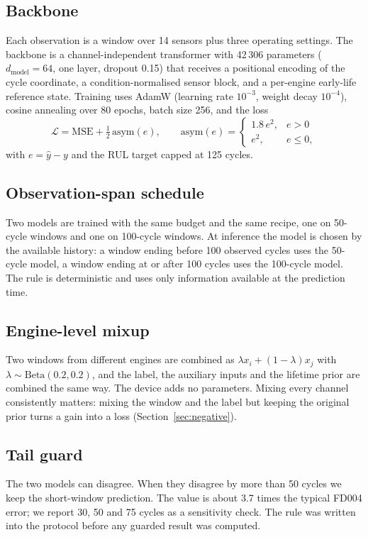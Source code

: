 \documentclass[journal]{IEEEtran}
\begin{document}
\subsection{Backbone}
Each observation is a window over 14 sensors plus three operating settings. The backbone is a channel-independent transformer with 42\,306 parameters ($d_{\mathrm{model}}=64$, one layer, dropout 0.15) that receives a positional encoding of the cycle coordinate, a condition-normalised sensor block, and a per-engine early-life reference state. Training uses AdamW (learning rate $10^{-3}$, weight decay $10^{-4}$), cosine annealing over 80 epochs, batch size 256, and the loss
\begin{equation}
\mathcal{L}=\mathrm{MSE}+\tfrac{1}{2}\,\mathrm{asym}(e),\qquad
\mathrm{asym}(e)=\begin{cases}1.8\,e^2, & e>0\\ e^2, & e\le 0,\end{cases}
\end{equation}
with $e=\hat{y}-y$ and the RUL target capped at 125 cycles.

\subsection{Observation-span schedule}
Two models are trained with the same budget and the same recipe, one on 50-cycle windows and one on 100-cycle windows. At inference the model is chosen by the available history: a window ending before 100 observed cycles uses the 50-cycle model, a window ending at or after 100 cycles uses the 100-cycle model. The rule is deterministic and uses only information available at the prediction time.

\subsection{Engine-level mixup}
Two windows from different engines are combined as $\lambda x_i+(1-\lambda)x_j$ with $\lambda\sim\mathrm{Beta}(0.2,0.2)$, and the label, the auxiliary inputs and the lifetime prior are combined the same way. The device adds no parameters. Mixing every channel consistently matters: mixing the window and the label but keeping the original prior turns a gain into a loss (Section~\ref{sec:negative}).

\subsection{Tail guard}
The two models can disagree. When they disagree by more than 50 cycles we keep the short-window prediction. The value is about 3.7 times the typical FD004 error; we report 30, 50 and 75 cycles as a sensitivity check. The rule was written into the protocol before any guarded result was computed.
\end{document}
